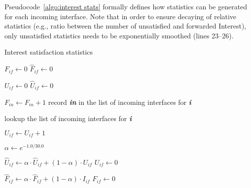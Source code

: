 Pseudocode~\ref{algo:interest stats} formally defines how statistics can be generated for  each incoming interface. Note that in order to ensure decaying of relative statistics (e.g., ratio between the number of unsatisfied and forwarded Interest), only unsatisfied statistics needs to be exponentially smoothed (lines 23--26).  



\begin{algorithm}[h]
\footnotesize
\caption{\small Interest satisfaction statistics}
\label{algo:interest stats}
\begin{algorithmic}[1]

    \State $F_{if} \leftarrow 0$ 
    \State $\hat F_{if} \leftarrow 0$ 

    \State $U_{if} \leftarrow 0$ 
    \State $\hat U_{if} \leftarrow 0$ 
\EndFor

\vspace{0.1cm}
  \State $F_{in} \leftarrow F_{in} + 1$
  \State record \textbf{\emph{in}} in the list of incoming interfaces for \textbf{\emph{i}}
\EndFunction

\vspace{0.1cm}
    \State lookup the list of incoming interfaces for \textbf{\emph{i}}

        \State $U_{if} \leftarrow U_{if} + 1$
    \EndFor
\EndFunction

\vspace{0.1cm}

\State {} 
 
\State $\alpha \leftarrow e^{-1.0/30.0}$  %

    \State $\hat U_{if} \leftarrow \alpha \cdot \hat U_{if} + (1 - \alpha) \cdot U_{if}$ 
    \State $U_{if} \leftarrow 0$ 

     
        \State $\hat F_{if} \leftarrow \alpha \cdot \hat F_{if} + (1 - \alpha) \cdot I_{if}$ 
        \State $F_{if} \leftarrow 0$ 
    \EndIf
\EndFor

\EndFunction

\end{algorithmic}
\end{algorithm}


